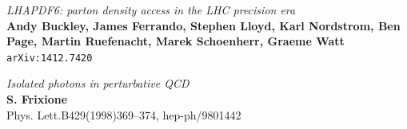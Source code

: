 \documentclass[11pt,a4paper]{report}
\begin{document}
\begin{thebibliography}{9}
	\textit{LHAPDF6: parton density access in the LHC precision era}\\
	\textbf{Andy Buckley, James Ferrando, Stephen Lloyd, Karl Nordstrom, Ben Page, Martin Ruefenacht, Marek Schoenherr, Graeme Watt}\\
	\texttt{arXiv:1412.7420}

	\textit{Isolated photons in perturbative QCD}\\	
	\textbf{S. Frixione}\\
	Phys. Lett.B429(1998)369–374, hep-ph/9801442
%	
%	
%	
%	
	
\end{thebibliography}
\end{document}
